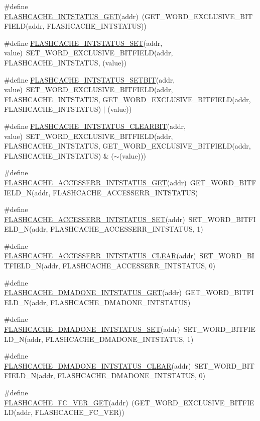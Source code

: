 \begin{DoxyCompactItemize}
\item 
\#define \hyperlink{a00549_a2ab7406e0399eed90974b1cc816d8be0}{FLASHCACHE\_\-INTSTATUS\_\-GET}(addr)~(GET\_\-WORD\_\-EXCLUSIVE\_\-BITFIELD(addr, FLASHCACHE\_\-INTSTATUS))
\item 
\#define \hyperlink{a00549_add557ac8c4d6093300962e7fe7b41726}{FLASHCACHE\_\-INTSTATUS\_\-SET}(addr, value)~SET\_\-WORD\_\-EXCLUSIVE\_\-BITFIELD(addr, FLASHCACHE\_\-INTSTATUS, (value))
\item 
\#define \hyperlink{a00549_a6f50babf85cf642e1867fd0356d75900}{FLASHCACHE\_\-INTSTATUS\_\-SETBIT}(addr, value)~SET\_\-WORD\_\-EXCLUSIVE\_\-BITFIELD(addr, FLASHCACHE\_\-INTSTATUS, GET\_\-WORD\_\-EXCLUSIVE\_\-BITFIELD(addr, FLASHCACHE\_\-INTSTATUS) $|$ (value))
\item 
\#define \hyperlink{a00549_afd6a77816638a53f92fb4681e0fbed32}{FLASHCACHE\_\-INTSTATUS\_\-CLEARBIT}(addr, value)~SET\_\-WORD\_\-EXCLUSIVE\_\-BITFIELD(addr, FLASHCACHE\_\-INTSTATUS, GET\_\-WORD\_\-EXCLUSIVE\_\-BITFIELD(addr, FLASHCACHE\_\-INTSTATUS) \& ($\sim$(value)))
\item 
\#define \hyperlink{a00549_ad3829bf6ff9ca7a21c1820e8fffa02de}{FLASHCACHE\_\-ACCESSERR\_\-INTSTATUS\_\-GET}(addr)~GET\_\-WORD\_\-BITFIELD\_\-N(addr, FLASHCACHE\_\-ACCESSERR\_\-INTSTATUS)
\item 
\#define \hyperlink{a00549_a722d509af78b76c41942b94e3e86773a}{FLASHCACHE\_\-ACCESSERR\_\-INTSTATUS\_\-SET}(addr)~SET\_\-WORD\_\-BITFIELD\_\-N(addr, FLASHCACHE\_\-ACCESSERR\_\-INTSTATUS, 1)
\item 
\#define \hyperlink{a00549_a663744c85e0c74baaa943d0ffda11dff}{FLASHCACHE\_\-ACCESSERR\_\-INTSTATUS\_\-CLEAR}(addr)~SET\_\-WORD\_\-BITFIELD\_\-N(addr, FLASHCACHE\_\-ACCESSERR\_\-INTSTATUS, 0)
\item 
\#define \hyperlink{a00549_aefec6e120ac73576d7611546f5cd2cef}{FLASHCACHE\_\-DMADONE\_\-INTSTATUS\_\-GET}(addr)~GET\_\-WORD\_\-BITFIELD\_\-N(addr, FLASHCACHE\_\-DMADONE\_\-INTSTATUS)
\item 
\#define \hyperlink{a00549_ac195103f6f4ce8bacd5671afffdbffa7}{FLASHCACHE\_\-DMADONE\_\-INTSTATUS\_\-SET}(addr)~SET\_\-WORD\_\-BITFIELD\_\-N(addr, FLASHCACHE\_\-DMADONE\_\-INTSTATUS, 1)
\item 
\#define \hyperlink{a00549_a3d875e1d02af82a2ec83a1f7a848d0ab}{FLASHCACHE\_\-DMADONE\_\-INTSTATUS\_\-CLEAR}(addr)~SET\_\-WORD\_\-BITFIELD\_\-N(addr, FLASHCACHE\_\-DMADONE\_\-INTSTATUS, 0)
\item 
\#define \hyperlink{a00549_a2f8ed61c97bab3d0dbffafee984f62e4}{FLASHCACHE\_\-FC\_\-VER\_\-GET}(addr)~(GET\_\-WORD\_\-EXCLUSIVE\_\-BITFIELD(addr, FLASHCACHE\_\-FC\_\-VER))

\end{DoxyCompactItemize}
